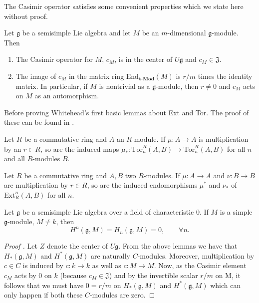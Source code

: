 The Casimir operator satisfies some convenient properties which we state here without proof.
\begin{lemma}
  Let $ \mathfrak{g} $ be a semisimple Lie algebra and let $ M $ be an $ m $-dimensional $ \mathfrak{g} $-module. Then
  \begin{enumerate}[label=(\roman*)]
    \item The Casimir operator for $ M $, $ c_M $, is in the center of $ U\mathfrak{g} $ and $ c_M \in \mathfrak{J} $.
    \item The image of $ c_M $ in the matrix ring $ \text{End}_{k\text{-}\mathbf{Mod}}(M) $ is $ r/m $ times the identity matrix. In particular, if $ M $ is nontrivial as a $ \mathfrak{g} $-module, then $ r \neq 0 $ and $ c_M $ acts on $ M $ as an automorphism.
  \end{enumerate}
\end{lemma}

Before proving Whitehead's first basic lemmas about Ext and Tor. The proof of these can be found in \cite[Chapter 3]{weibel1994homological}.

\begin{lemma}
  Let $ R $ be a commutative ring and $ A$ an $ R $-module. If $ \mu: A\to A $ is multiplication by an $ r \in R $, so are the induced maps $ \mu_*:\text{Tor}_n^{R}(A, B) \to \text{Tor}_n^{R}(A, B) $ for all $ n $ and all $ R $-modules $ B $.
\end{lemma}

\begin{lemma}
  Let $ R $ be a commutative ring and $ A,B $ two $ R $-modules. If $ \mu: A \to A $ and $ \nu: B \to B $ are multiplication by $ r \in R $, so are the induced endomorphisms $ \mu^{*} $ and $ \nu_* $ of $ \text{Ext}_R^{n}(A, B) $ for all $ n $.
\end{lemma}

\begin{theorem}
  \label{thm:zerohom}
  Let $ \mathfrak{g} $ be a semisimple Lie algebra over a field of characteristic 0. If $ M $ is a simple $ \mathfrak{g} $-module, $ M \neq k $, then
  \begin{equation}
    H^{n}(\mathfrak{g}, M) = H_n(\mathfrak{g}, M) = 0, \quad\quad \forall n.
  \end{equation}
\end{theorem}
\begin{proof}[Proof \cite{weibel1994homological}]
  Let $ Z $ denote the center of $ U\mathfrak{g} $. From the above lemmas we have that $ H_*(\mathfrak{g}, M) $ and $ H^*(\mathfrak{g}, M) $ are naturally $ C $-modules. Moreover, multiplication by $ c \in C $ is induced by $ c: k \to k $ as well as $ c:M \to M $. Now, as the Casimir element $ c_M $ acts by 0 on $ k $ (because $ c_M \in \mathfrak{J} $) and by the invertible scalar $ r /m $ on M, it follows that we must have $ 0 = r/m $ on $ H_*(\mathfrak{g}, M) $ and $ H^*(\mathfrak{g}, M) $ which can only happen if both these $ C $-modules are zero.
\end{proof}

